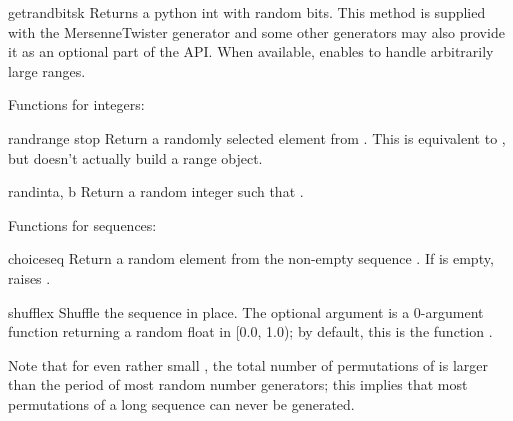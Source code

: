 \begin{funcdesc}{getrandbits}{k}
  Returns a python  int with  random bits.
  This method is supplied with the MersenneTwister generator and some
  other generators may also provide it as an optional part of the API.
  When available,  enables 
  to handle arbitrarily large ranges.
\end{funcdesc} 

Functions for integers:

\begin{funcdesc}{randrange}{ stop}
  Return a randomly selected element from .  This is equivalent to
  ,
  but doesn't actually build a range object.
\end{funcdesc}

\begin{funcdesc}{randint}{a, b}
  Return a random integer  such that
  .
\end{funcdesc}


Functions for sequences:

\begin{funcdesc}{choice}{seq}
  Return a random element from the non-empty sequence .
  If  is empty, raises .
\end{funcdesc}

\begin{funcdesc}{shuffle}{x}
  Shuffle the sequence  in place.
  The optional argument  is a 0-argument function
  returning a random float in [0.0, 1.0); by default, this is the
  function .

  Note that for even rather small , the total
  number of permutations of  is larger than the period of most
  random number generators; this implies that most permutations of a
  long sequence can never be generated.
\end{funcdesc}

